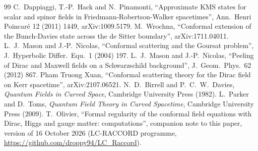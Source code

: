 \documentclass[11pt,a4paper]{article}
\theoremstyle{definition}
\begin{document}
\begin{thebibliography}{99}
 C.~Dappiaggi, T.-P.~Hack and N.~Pinamonti, ``Approximate KMS states for scalar and spinor fields in Friedmann-Robertson-Walker spacetimes'', Ann.\ Henri Poincar\'e 12 (2011) 1449, arXiv:1009.5179.
 M.~Wrochna, ``Conformal extension of the Bunch-Davies state across the de Sitter boundary'', arXiv:1711.04011.
 L.~J.~Mason and J.-P.~Nicolas, ``Conformal scattering and the Goursat problem'', J.\ Hyperbolic Differ.\ Equ.\ 1 (2004) 197.
 L.~J.~Mason and J.-P.~Nicolas, ``Peeling of Dirac and Maxwell fields on a Schwarzschild background'', J.\ Geom.\ Phys.\ 62 (2012) 867.
 Pham Truong Xuan, ``Conformal scattering theory for the Dirac field on Kerr spacetime'', arXiv:2107.06521.
 N.~D.~Birrell and P.~C.~W.~Davies, \emph{Quantum Fields in Curved Space}, Cambridge University Press (1982).
 L.~Parker and D.~Toms, \emph{Quantum Field Theory in Curved Spacetime}, Cambridge University Press (2009).
 T.~Olivier, ``Formal regularity of the conformal field equations with Dirac, Higgs and gauge matter: computations'', companion note to this paper, version of 16 October 2026 (LC-RACCORD programme, \url{https://github.com/droppy94/LC_Raccord}).
\end{thebibliography}
\end{document}
